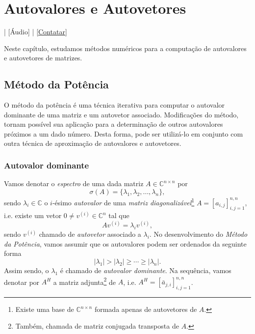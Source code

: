 
\chapter{Autovalores e Autovetores}\label{cap_autoval}
\thispagestyle{fancy}

\begin{flushright}
  [Vídeo] | [Áudio] | \href{https://phkonzen.github.io/notas/contato.html}{[Contatar]}
\end{flushright}

Neste capítulo, estudamos métodos numéricos para a computação de autovalores e autovetores de matrizes.

\section{Método da Potência}\label{cap_autoval_sec_pot}

O método da potência é uma técnica iterativa para computar o autovalor dominante de uma matriz e um autovetor associado. Modificações do método, tornam possível sua aplicação para a determinação de outros autovalores próximos a um dado número. Desta forma, pode ser utilizá-lo em conjunto com outra técnica de aproximação de autovalores e autovetores.

\subsection{Autovalor dominante}

Vamos denotar o \emph{espectro} de uma dada matriz $A\in\mathbb{C}^{n\times n}$ por
\begin{equation}
  \sigma(A) = \{\lambda_1, \lambda_2, \dotsc, \lambda_n\},
\end{equation}
sendo $\lambda_i\in \mathbb{C}$ o $i$-ésimo \emph{autovalor} de uma \emph{matriz diagonalizável}\footnote{Existe uma base de $\mathbb{C}^{n\times n}$ formada apenas de autovetores de $A$.} $A=[a_{i,j}]_{i,j=1}^{n,n}$, i.e. existe um vetor $0\neq v^{(i)}\in\mathbb{C}^n$ tal que
\begin{equation}
  Av^{(i)} = \lambda_i v^{(i)},
\end{equation}
sendo $v^{(i)}$ chamado de \emph{autovetor} associado a $\lambda_i$. No desenvolvimento do \emph{Método da Potência}, vamos assumir que os autovalores podem ser ordenados da seguinte forma
\begin{equation}
  |\lambda_1| > |\lambda_2| \geq \cdots \geq |\lambda_n|.
\end{equation}
Assim sendo, o $\lambda_1$ é chamado de \emph{autovalor dominante}. Na sequência, vamos denotar por $A^H$ a matriz adjunta\footnote{Também, chamada de matriz conjugada transposta de $A$.} de $A$, i.e. $A^H=[\bar{a}_{j,i}]_{i,j=1}^{n,n}$.

